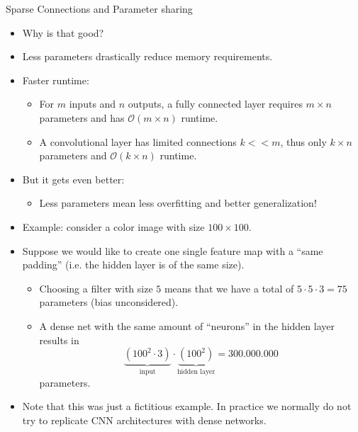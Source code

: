 {\begin{itemize}
  \end{itemize}

}
\begin{vbframe}{Sparse Connections and Parameter sharing}
  \begin{itemize}
    \item Why is that good?
    \item Less parameters drastically reduce memory requirements.
    \item Faster runtime:
    \begin{itemize}
      \item For $m$ inputs and $n$ outputs, a fully connected layer requires $m\times n$ parameters and has $\mathcal{O}(m\times n)$ runtime.
      \item A convolutional layer has limited connections $k<<m$, thus only $k\times n$ parameters and $\mathcal{O}(k\times n)$ runtime.
    \end{itemize}
    \item But it gets even better:
    \begin{itemize}
      \item Less parameters mean less overfitting and better generalization!
    \end{itemize}
  \end{itemize}
\framebreak
  \begin{itemize}
    \item Example: consider a color image with size $100 \times 100$.
    \item Suppose we would like to create one single feature map with a \enquote{same padding} (i.e. the hidden layer is of the same size).
    \begin{itemize}
      \item Choosing a filter with size $5$ means that we have a total of $5 \cdot 5 \cdot 3 = 75$ parameters (bias unconsidered).
      \item A dense net with the same amount of \enquote{neurons} in the hidden layer results in 
      $$\underbrace{(100^2 \cdot 3)}_{\text{input}} \cdot \underbrace{(100^2)}_{\text{hidden layer}} = 300.000.000 $$ parameters.
      
      
    \end{itemize}
  \item Note that this was just a fictitious example. In practice we normally do not try to replicate CNN architectures with dense networks.
  \end{itemize}
\end{vbframe}

